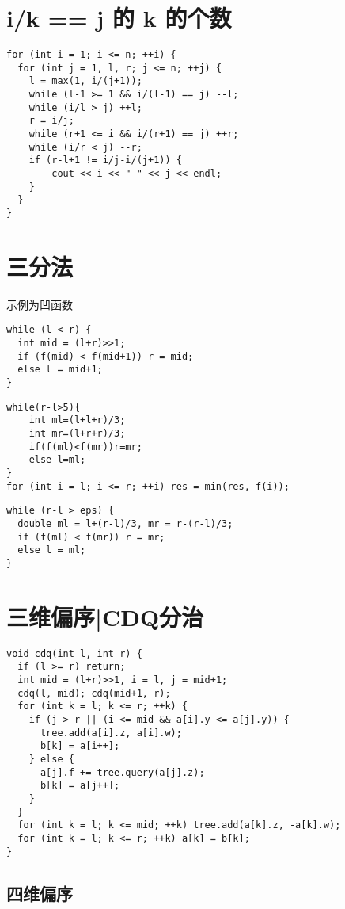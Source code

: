 \documentclass[12pt]{article}
\begin{document}
{{{{\section{ i/k == j 的 k 的个数}
{\setmainfont{Consolas}
\begin{lstlisting}
for (int i = 1; i <= n; ++i) {
  for (int j = 1, l, r; j <= n; ++j) {
    l = max(1, i/(j+1));
    while (l-1 >= 1 && i/(l-1) == j) --l;
    while (i/l > j) ++l;
    r = i/j;
    while (r+1 <= i && i/(r+1) == j) ++r;
    while (i/r < j) --r;
    if (r-l+1 != i/j-i/(j+1)) {
        cout << i << " " << j << endl;
    }
  }
}
\end{lstlisting}

\section{ 三分法}
示例为凹函数
{\setmainfont{Consolas}
\begin{lstlisting}
while (l < r) {
  int mid = (l+r)>>1;
  if (f(mid) < f(mid+1)) r = mid;
  else l = mid+1;
}
\end{lstlisting}
{\setmainfont{Consolas}
\begin{lstlisting}
while(r-l>5){
	int ml=(l+l+r)/3;
	int mr=(l+r+r)/3;
	if(f(ml)<f(mr))r=mr;
	else l=ml;
}
for (int i = l; i <= r; ++i) res = min(res, f(i));
\end{lstlisting}
{\setmainfont{Consolas}
\begin{lstlisting}
while (r-l > eps) {
  double ml = l+(r-l)/3, mr = r-(r-l)/3;
  if (f(ml) < f(mr)) r = mr;
  else l = ml;
}
\end{lstlisting}

\section{ 三维偏序|CDQ分治}
{\setmainfont{Consolas}
\begin{lstlisting}
void cdq(int l, int r) {
  if (l >= r) return;
  int mid = (l+r)>>1, i = l, j = mid+1;
  cdq(l, mid); cdq(mid+1, r);
  for (int k = l; k <= r; ++k) {
    if (j > r || (i <= mid && a[i].y <= a[j].y)) {
      tree.add(a[i].z, a[i].w);
      b[k] = a[i++];
    } else {
      a[j].f += tree.query(a[j].z);
      b[k] = a[j++];
    }
  }
  for (int k = l; k <= mid; ++k) tree.add(a[k].z, -a[k].w);
  for (int k = l; k <= r; ++k) a[k] = b[k];
}
\end{lstlisting}

\subsection{四维偏序}

}}}}}}}}}
\end{document}
